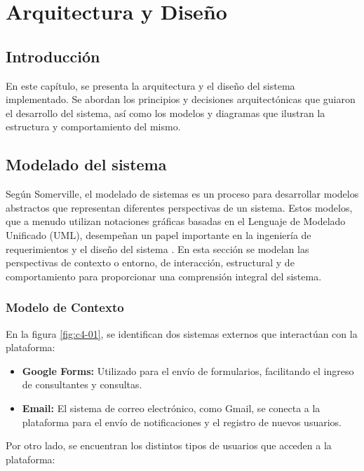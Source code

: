 \chapter{Arquitectura y Diseño}\label{cap:arquitectura-diseño}

\section{Introducción}
En este capítulo, se presenta la arquitectura y el diseño del sistema implementado. Se abordan los principios y decisiones arquitectónicas que guiaron el desarrollo del sistema, así como los modelos y diagramas que ilustran la estructura y comportamiento del mismo.


\section{Modelado del sistema}
Según Somerville, el modelado de sistemas es un proceso para desarrollar modelos abstractos que representan diferentes perspectivas de un sistema. Estos modelos, que a menudo utilizan notaciones gráficas basadas en el Lenguaje de Modelado Unificado (UML), desempeñan un papel importante en la ingeniería de requerimientos y el diseño del sistema \cite{Somerville}. 
En esta sección se modelan las perspectivas de contexto o entorno, de interacción, estructural y de comportamiento para proporcionar una comprensión integral del sistema.


\subsection{Modelo de Contexto}

En la figura \ref{fig:c4-01}, se identifican dos sistemas externos que interactúan con la plataforma:

\begin{itemize}
    \item \textbf{Google Forms:} Utilizado para el envío de formularios, facilitando el ingreso de consultantes y consultas.
    \item \textbf{Email:} El sistema de correo electrónico, como Gmail, se conecta a la plataforma para el envío de notificaciones y el registro de nuevos usuarios.
\end{itemize}

Por otro lado, se encuentran los distintos tipos de usuarios que acceden a la plataforma:

